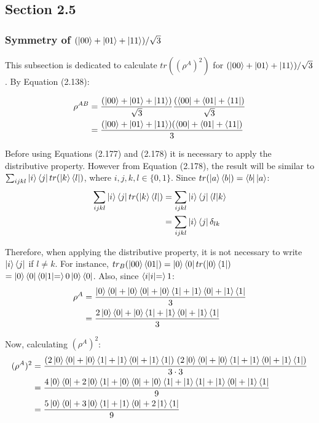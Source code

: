 \subsection{Section 2.5}
\subsubsection{Symmetry of $(\ket{00} + \ket{01} + \ket{11})/\sqrt{3}$}

This subsection is dedicated to calculate $tr((\rho^A)^2)$
for $(\ket{00} + \ket{01} + \ket{11})/\sqrt{3}$. By Equation (2.138):

\begin{align}
    \rho^{AB} &= \frac{(\ket{00} + \ket{01} + \ket{11})}{\sqrt{3}}
        \frac{(\bra{00} + \bra{01} + \bra{11})}{\sqrt{3}} \\
        &= \frac{(\ket{00} + \ket{01} + \ket{11})(\bra{00} + \bra{01} + \bra{11})}{3}
\end{align}

Before using Equations (2.177) and (2.178) it is necessary to apply the distributive property.
However from Equation (2.178), the result will be similar to
$\sum_{ijkl} \ket{i}\bra{j} tr(\ket{k}\bra{l})$, where $i, j, k, l \in \{0, 1\}$.
Since $tr(\ket{a}\bra{b}) = \bra{b}\ket{a}$:
\begin{align}
    \sum_{ijkl} \ket{i}\bra{j} tr(\ket{k}\bra{l}) &=
        \sum_{ijkl} \ket{i}\bra{j}\mathop{\mathinner{ \langle{l}|{k}\rangle}} \\
        &= \sum_{ijkl} \ket{i}\bra{j}\delta_{lk}
\end{align}

Therefore, when applying the distributive property,
it is not necessary to write $\ket{i}\bra{j}$ if $l \neq k$.
For instance,
$tr_B(\ket{00}\bra{01}) = \ket{0}\bra{0}tr(\ket{0}\bra{1})$
$= \ket{0}\bra{0}\mathop{\mathinner{ \langle{0|1}|{=}\rangle}} 0 \ket{0}\bra{0}$.
Also, since $\mathop{\mathinner{ \langle{i|i}|{=}\rangle}} 1$:
\begin{align}
    \rho^A &= \frac{\ket{0}\bra{0} + \ket{0}\bra{0} + \ket{0}\bra{1} +
        \ket{1}\bra{0} + \ket{1}\bra{1}}{3} \\
    &= \frac{2\ket{0}\bra{0} + \ket{0}\bra{1} +
        \ket{1}\bra{0} + \ket{1}\bra{1}}{3}
\end{align}

Now, calculating $(\rho^A)^2$:
\begin{align}
    (\rho^A)^2 &= \frac{(2\ket{0}\bra{0} + \ket{0}\bra{1} +
        \ket{1}\bra{0} + \ket{1}\bra{1})\ (2\ket{0}\bra{0} + \ket{0}\bra{1} +
        \ket{1}\bra{0} + \ket{1}\bra{1})}{3 \cdot 3} \\
    &= \frac{4\ket{0}\bra{0} + 2\ket{0}\bra{1} + \ket{0}\bra{0} + \ket{0}\bra{1} +
        \ket{1}\bra{1} + \ket{1}\bra{0} + \ket{1}\bra{1}}{9} \\
    &= \frac{5\ket{0}\bra{0} + 3\ket{0}\bra{1} + \ket{1}\bra{0} + 2\ket{1}\bra{1}}{9}
\end{align}

